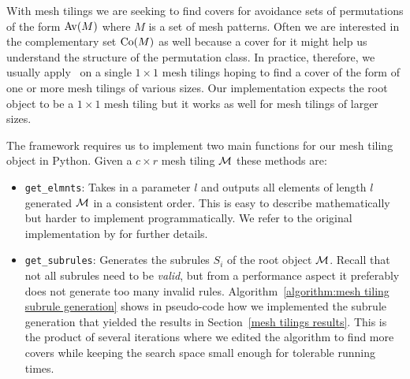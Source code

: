 With mesh tilings we are seeking to find covers for avoidance sets of 
permutations of the form ${\mathrm{Av}\!\left(M\right)}$ where $M$ is a set of mesh patterns. Often we 
are interested in the complementary set ${\mathrm{Co}\!\left(M\right)}$ as well because a cover for it 
might help us understand the structure of the permutation class. In practice, 
therefore, we usually apply \CombCov\ on a single $1 \times 1$ mesh tilings 
hoping to find a cover of the form of one or more mesh tilings of various sizes. 
Our implementation expects the root object to be a $1 \times 1$ mesh tiling but 
it works as well for mesh tilings of larger sizes.

The framework requires us to implement two main functions for our mesh tiling 
object in Python. Given a $c \times r$ mesh tiling ${\mathcal{M}}$ these methods are:
\begin{itemize}[(i)]
  \item \texttt{get\_elmnts}: Takes in a parameter $l$ and outputs all elements 
    of length $l$ generated ${\mathcal{M}}$ in a consistent order. This is easy to 
    describe mathematically but harder to implement programmatically. We refer 
    to the original implementation by \textcite{bean_permstruct_2017} for 
    further details.
  \item \texttt{get\_subrules}: Generates the subrules $S_i$ of the root object 
    ${\mathcal{M}}$. Recall that not all subrules need to be \emph{valid}, but from a 
    performance aspect it preferably does not generate too many invalid rules. 
    Algorithm~\ref{algorithm:mesh tiling subrule generation} shows in 
    pseudo-code how we implemented the subrule generation that yielded the 
    results in Section~\ref{mesh tilings results}. This is the product of 
    several iterations where we edited the algorithm to find more covers while 
    keeping the search space small enough for tolerable running times.
\end{itemize}

